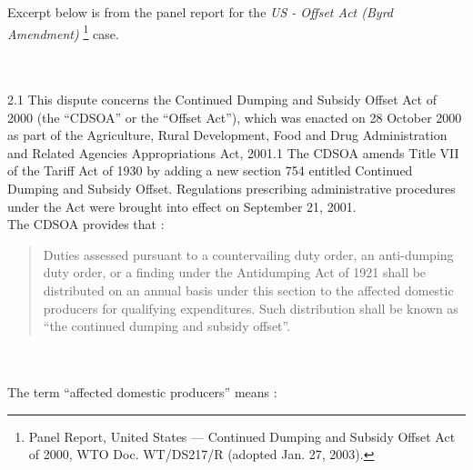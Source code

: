Excerpt below is from the panel report for the 
\textit{US - Offset Act (Byrd Amendment)}
\footnote{Panel Report, United States — Continued Dumping and Subsidy Offset Act of 2000, WTO Doc. WT/DS217/R (adopted Jan. 27, 2003).} case.\\

\begin{tcolorbox}[breakable]
\\\\
2.1 \quad This dispute concerns the Continued Dumping and Subsidy Offset Act of 2000 (the
“CDSOA” or the “Offset Act”), which was enacted on 28 October 2000 as part of the Agriculture,
Rural Development, Food and Drug Administration and Related Agencies Appropriations Act, 2001.1
The CDSOA amends Title VII of the Tariff Act of 1930 by adding a new section 754 entitled
Continued Dumping and Subsidy Offset. Regulations prescribing administrative procedures under the
Act were brought into effect on September 21, 2001.\\

 \quad The CDSOA provides that :

\blockquote{
    Duties assessed pursuant to a countervailing duty order, an anti-dumping duty order,
    or a finding under the Antidumping Act of 1921 shall be distributed on an annual
    basis under this section to the affected domestic producers for qualifying
    expenditures. Such distribution shall be known as “the continued dumping and
    subsidy offset”.
    }
\\\\
 \quad The term “affected domestic producers” means :


\end{tcolorbox}

